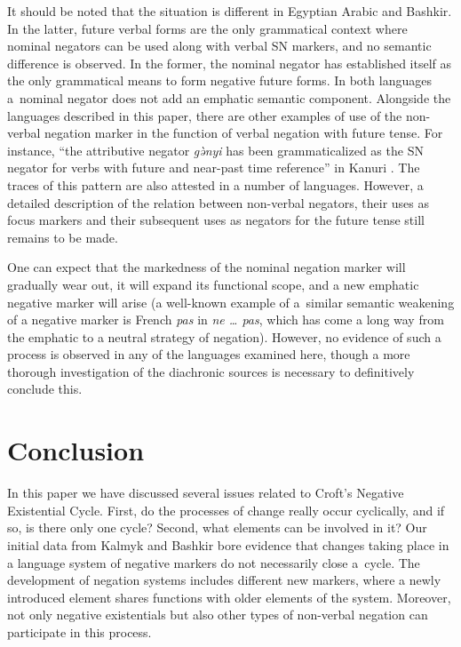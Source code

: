 \documentclass[output=paper]{langsci/langscibook}
\begin{document}
It should be noted that the situation is different in Egyptian Arabic and Bashkir. In the latter, future verbal forms are the only grammatical context where nominal negators can be used along with verbal SN markers, and no semantic difference is observed. In the former, the nominal negator has established itself as the only grammatical means to form negative future forms. In both languages a nominal negator does not add an emphatic semantic component. Alongside the languages described in this paper, there are other examples of use of the non-verbal negation marker in the function of verbal negation with future tense. For instance, “the attributive negator \textit{gə̀nyi} has been grammaticalized as the SN negator for verbs with future and near-past time reference” in Kanuri \citep[172]{Veselinova2016}. The traces of this pattern are also attested in a number of languages. However, a detailed description of the relation between non-verbal negators, their uses as focus markers and their subsequent uses as negators for the future tense still remains to be made.

One can expect that the markedness of the nominal negation marker will gradually wear out, it will expand its functional scope, and a new emphatic negative marker will arise (a well-known example of a similar semantic weakening of a negative marker is French \textit{pas} in \textit{ne … pas}, which has come a long way from the emphatic to a neutral strategy of negation). However, no evidence of such a process is observed in any of the languages examined here, though a more thorough investigation of the diachronic sources is necessary to definitively conclude this.

\section{Conclusion}\label{sec:BK5}

In this paper we have discussed several issues related to Croft’s Negative Existential Cycle. First, do the processes of change really occur cyclically, and if so, is there only one cycle? Second, what elements can be involved in it? Our initial data from Kalmyk and Bashkir bore evidence that changes taking place in a language system of negative markers do not necessarily close a cycle. The development of negation systems includes different new markers, where a newly introduced element shares functions with older elements of the system. Moreover, not only negative existentials but also other types of non-verbal negation can participate in this process.
\end{document}
